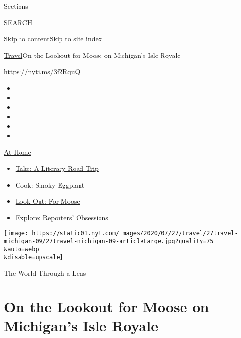 Sections

SEARCH

\protect\hyperlink{site-content}{Skip to
content}\protect\hyperlink{site-index}{Skip to site index}

\href{/section/travel}{Travel}\textbar{}On the Lookout for Moose on
Michigan's Isle Royale

\url{https://nyti.ms/3f2RquQ}

\begin{itemize}
\item
\item
\item
\item
\item
\item
\end{itemize}

\href{https://www.nytimes.com/spotlight/at-home?action=click\&pgtype=Article\&state=default\&region=TOP_BANNER\&context=at_home_menu}{At
Home}

\begin{itemize}
\tightlist
\item
  \href{https://www.nytimes.com/2020/07/28/books/time-for-a-literary-road-trip.html?action=click\&pgtype=Article\&state=default\&region=TOP_BANNER\&context=at_home_menu}{Take:
  A Literary Road Trip}
\item
  \href{https://www.nytimes.com/2020/07/29/magazine/bored-with-your-home-cooking-some-smoky-eggplant-will-fix-that.html?action=click\&pgtype=Article\&state=default\&region=TOP_BANNER\&context=at_home_menu}{Cook:
  Smoky Eggplant}
\item
  \href{https://www.nytimes.com/2020/07/27/travel/moose-michigan-isle-royale.html?action=click\&pgtype=Article\&state=default\&region=TOP_BANNER\&context=at_home_menu}{Look
  Out: For Moose}
\item
  \href{https://www.nytimes.com/interactive/2020/at-home/even-more-reporters-editors-diaries-lists-recommendations.html?action=click\&pgtype=Article\&state=default\&region=TOP_BANNER\&context=at_home_menu}{Explore:
  Reporters' Obsessions}
\end{itemize}

\texttt{[image: https://static01.nyt.com/images/2020/07/27/travel/27travel-michigan-09/27travel-michigan-09-articleLarge.jpg?quality=75\\\&auto=webp\\\&disable=upscale]}

The World Through a Lens

\hypertarget{on-the-lookout-for-moose-on-michigans-isle-royale}{%
\section{On the Lookout for Moose on Michigan's Isle
Royale}\label{on-the-lookout-for-moose-on-michigans-isle-royale}}

